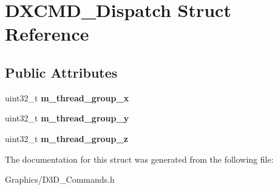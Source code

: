 \hypertarget{structDXCMD__Dispatch}{}\section{D\+X\+C\+M\+D\+\_\+\+Dispatch Struct Reference}
\label{structDXCMD__Dispatch}
\subsection*{Public Attributes}
\begin{DoxyCompactItemize}
\item 
\mbox{\label{structDXCMD__Dispatch_af44836d5e2884dcdbf67025db8f9758f}} 
uint32\+\_\+t {\bfseries m\+\_\+thread\+\_\+group\+\_\+x}
\item 
\mbox{\label{structDXCMD__Dispatch_a27ec6beca765befefa6f6415231f2699}} 
uint32\+\_\+t {\bfseries m\+\_\+thread\+\_\+group\+\_\+y}
\item 
\mbox{\label{structDXCMD__Dispatch_ad1d1a45f48dffe179f8c769405ebae41}} 
uint32\+\_\+t {\bfseries m\+\_\+thread\+\_\+group\+\_\+z}
\end{DoxyCompactItemize}


The documentation for this struct was generated from the following file\+:\begin{DoxyCompactItemize}
\item 
Graphics/D3\+D\+\_\+\+Commands.\+h\end{DoxyCompactItemize}

